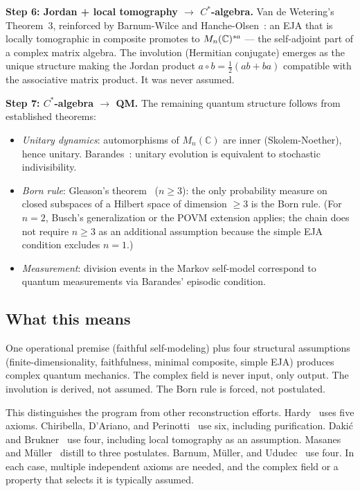 \textbf{Step 6: Jordan + local tomography $\to$ $C^*$-algebra.}  Van
de Wetering's Theorem~3, reinforced by Barnum-Wilce and
Hanche-Olsen~\citep{hancheolsen1985}: an EJA that is locally
tomographic in composite promotes to $M_{n}(\mathbb{C})^{sa}$ --- the self-adjoint
part of a complex matrix algebra.  The involution (Hermitian conjugate)
emerges as the unique structure making the Jordan product
$a \circ b = \tfrac{1}{2}(ab + ba)$ compatible with the associative
matrix product.  It was never assumed.

\textbf{Step 7: $C^*$-algebra $\to$ QM.}  The remaining quantum
structure follows from established theorems:
\begin{itemize}[nosep]
\item \emph{Unitary dynamics}: automorphisms of $M_n(\mathbb{C})$ are
  inner (Skolem-Noether), hence unitary.
  Barandes~\citep{barandes2025}: unitary evolution is equivalent to
  stochastic indivisibility.
\item \emph{Born rule}: Gleason's theorem~\citep{gleason1957}
  ($n \geq 3$): the only probability measure on closed subspaces of a
  Hilbert space of dimension $\geq 3$ is the Born rule.  (For $n = 2$,
  Busch's generalization or the POVM extension applies; the chain
  does not require $n \geq 3$ as an additional assumption because the
  simple EJA condition excludes $n = 1$.)
\item \emph{Measurement}: division events in the Markov self-model
  correspond to quantum measurements via Barandes' episodic condition.
\end{itemize}

\subsection{What this means}
\label{subsec:what-this-means}

One operational premise (faithful self-modeling) plus four structural
assumptions (finite-dimensionality, faithfulness, minimal composite,
simple EJA) produces complex quantum mechanics.  The complex field is
never input, only output.  The involution is derived, not assumed.  The
Born rule is forced, not postulated.

This distinguishes the program from other reconstruction efforts.
Hardy~\citep{hardy2001} uses five axioms.  Chiribella, D'Ariano, and
Perinotti~\citep{cdp2011} use six, including purification.  Daki\'c
and Brukner~\citep{dakicbrukner2011} use four, including local
tomography as an assumption.
Masanes and M\"uller~\citep{masanesmuelleretal2013} distill to three
postulates.  Barnum, M\"uller, and
Ududec~\citep{barnummuellerududec2014} use four.  In each case,
multiple independent axioms are needed, and the complex field or a
property that selects it is typically assumed.

